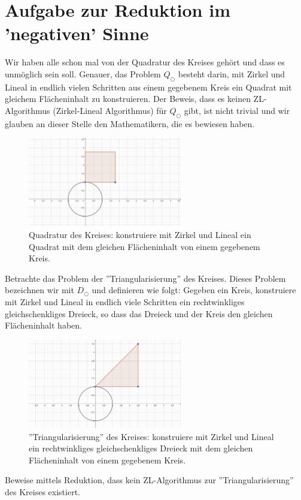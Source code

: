 \documentclass[
	12pt, %
	german, %
]{fphw}
\begin{document}

\section*{Aufgabe zur Reduktion im 'negativen' Sinne}

\begin{problem}
Wir haben alle schon mal von der Quadratur des Kreises gehört und dass es unmöglich sein soll. Genauer, das Problem \(Q_{\bigcirc}\) besteht darin, mit Zirkel und Lineal in endlich vielen Schritten aus einem gegebenem Kreis ein Quadrat mit gleichem Flächeninhalt zu konstruieren. Der Beweis, dass es keinen ZL-Algorithmus (Zirkel-Lineal Algorithmus) für \(Q_{\bigcirc}\) gibt, ist nicht trivial und wir glauben an dieser Stelle den Mathematikern, die es bewiesen haben.

\begin{figure}[H]
	\centering
	\includegraphics[width=0.6\textwidth]{Negativ-QuadraturDesKreises1.png}
	\caption{Quadratur des Kreises: konstruiere mit Zirkel und Lineal ein Quadrat mit dem gleichen Flächeninhalt von einem gegebenem Kreis.}
\end{figure}

Betrachte das Problem der ''Triangularisierung'' des Kreises. Dieses Problem bezeichnen wir mit \(D_{\bigcirc}\) und definieren wie folgt: Gegeben ein Kreis, konstruiere mit Zirkel und Lineal in endlich viele Schritten ein rechtwinkliges gleichschenkliges Dreieck, so dass das Dreieck und der Kreis den gleichen Flächeninhalt haben.
\begin{figure}[H]
	\centering
	\includegraphics[width=0.6\textwidth]{Negativ-TriangulaturDesKreises1.png}
	\caption{''Triangularisierung'' des Kreises: konstruiere mit Zirkel und Lineal ein rechtwinkliges gleichschenkliges Dreieck mit dem gleichen Flächeninhalt von einem gegebenem Kreis.}
\end{figure}
Beweise mittels Reduktion, dass kein ZL-Algorithmus zur ''Triangularisierung'' des Kreises existiert.
\end{problem}
\end{document}
